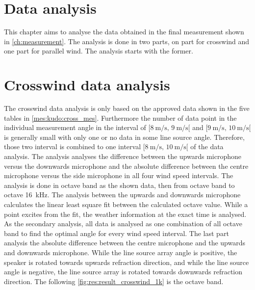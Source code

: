\section{Data analysis}
This chapter aims to analyse the data obtained in the final measurement shown in \autoref{ch:measurement}. The analysis is done in two parts, on part for crosswind and one part for parallel wind. The analysis starts with the former. 



\section{Crosswind data analysis}\label{res:cross_data_ana}
The crosswind data analysis is only based on the approved data shown in the five tables in \autoref{mes:kudo:cross_mes}. Furthermore the number of data point in the individual measurement angle in the interval of $[\SI{8}{\meter\per\second},\, \SI{9}{\meter\per\second}[ $ and $[\SI{9}{\meter\per\second},\, \SI{10}{\meter\per\second}[ $ is generally small with only one or no data in some line source angle. Therefore, those two interval is combined to one interval $[\SI{8}{\meter\per\second},\, \SI{10}{\meter\per\second}[ $ of the data analysis. The analysis analyses the difference between the upwards microphone versus the downwards microphone and the absolute difference between the centre microphone versus the side microphone in all four wind speed intervals. The analysis is done in octave band as the shown data, then from octave band  to octave \SI{16}{\kilo\hertz}. The analysis between the upwards and downwards microphone calculates the linear least square fit between the calculated octave value. While a point excites  from the fit, the weather information at the exact time is analysed. As the secondary analysis, all data is analysed as one combination of all octave band to find the optimal angle for every wind speed interval. The last part analysis the absolute difference between the centre microphone and the upwards and downwards microphone. While the line source array angle is positive, the speaker is rotated towards upwards refraction direction, and while the line source angle is negative, the line source array is rotated towards downwards refraction direction. The following \autoref{fig:res:result_crosswind_1k}  is the  octave band.  


 
